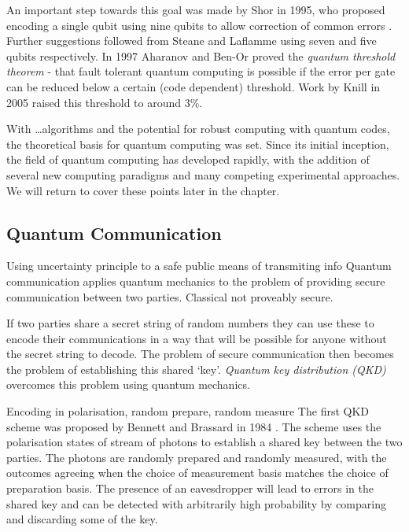 An important step towards this goal was made by Shor in 1995, who proposed encoding a single qubit using nine qubits to allow correction of common errors \cite{shor_codes_95}. Further suggestions followed from Steane and Laflamme \cite{steane_code_96, steane_code_96_2, laflamme_5_code} using seven and five qubits respectively. In 1997 Aharanov and Ben-Or proved the \textit{quantum threshold theorem} - that fault tolerant quantum computing is possible if the error per gate can be reduced below a certain (code dependent) threshold. Work by Knill in 2005 \cite{knill_correction} raised this threshold to around 3\%. 

With \ldots algorithms and the potential for robust computing with quantum codes, the theoretical basis for quantum computing was set. Since its initial inception, the field of quantum computing has developed rapidly, with the addition of several new computing paradigms and many competing experimental approaches. We will return to cover these points later in the chapter.

\subsection{Quantum Communication}


Using uncertainty principle to a safe public means of transmiting info
Quantum communication applies quantum mechanics to the problem of providing secure communication between two parties. Classical not proveably secure.

If two parties share a secret string of random numbers they can use these to encode their communications in a way that will be possible for anyone without the secret string to decode. The problem of secure communication then becomes the problem of establishing this shared `key'. \textit{Quantum key distribution (QKD)} overcomes this problem using quantum mechanics.

Encoding in polarisation, random prepare, random measure
The first QKD scheme was proposed by Bennett and Brassard in 1984 \cite{bennett_brassard_84}. The scheme uses the polarisation states of stream of photons to establish a shared key between the two parties. The photons are randomly prepared and randomly measured, with the outcomes agreeing when the choice of measurement basis matches the choice of preparation basis. The presence of an eavesdropper will lead to errors in the shared key and can be detected with arbitrarily high probability by comparing and discarding some of the key.

